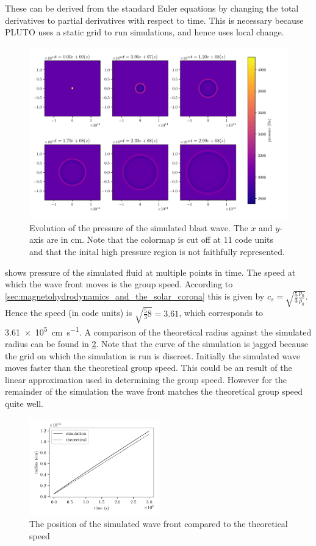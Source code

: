 \documentclass[a4paper]{article}
\numberwithin{figure}{section}
\numberwithin{equation}{section}
\begin{document}
These can be derived from the standard Euler equations by changing the total derivatives to partial derivatives with respect to time. This is necessary because PLUTO uses a static grid to run simulations, and hence uses local change. 
\begin{figure}[h]
	\centering
	\includegraphics[width=\textwidth]{figures/blast_wave.pdf}
	\caption{Evolution of the pressure of the simulated blast wave. The $x$ and $y$-axis are in \si{cm}. Note that the colormap is cut off at $11$ code units and that the inital high pressure region is not faithfully represented.}
	\label{fig:blastwave}
\end{figure}

 shows pressure of the simulated fluid at multiple points in time. 
The speed at which the wave front moves is the group speed. 
According to \cref{sec:magnetohydrodynamics_and_the_solar_corona} this is given by $c_s = \sqrt{\frac{5}{3} \frac{p_0}{\rho_0}} $.
Hence the speed (in code units) is $\sqrt{\frac{5}{3}8} = 3.61$, which corresponds to \SI{3.61e5}{\centi\metre\per\second}.
A comparison of the theoretical radius against the simulated radius can be found in \cref{fig:wave_front_speed}. 
Note that the curve of the simulation is jagged because the grid on which the simulation is run is discreet. 
Initially the simulated wave moves faster than the theoretical group speed. 
This could be an result of the linear approximation used in determining the group speed.
However for the remainder of the simulation the wave front matches the theoretical group speed quite well.


\begin{figure}[h]
	\centering
	\includegraphics[width=0.5\textwidth]{figures/wavefront_position.pdf}
	\caption{The position of the simulated wave front compared to the theoretical speed}
	\label{fig:wave_front_speed}
\end{figure}
\end{document}
